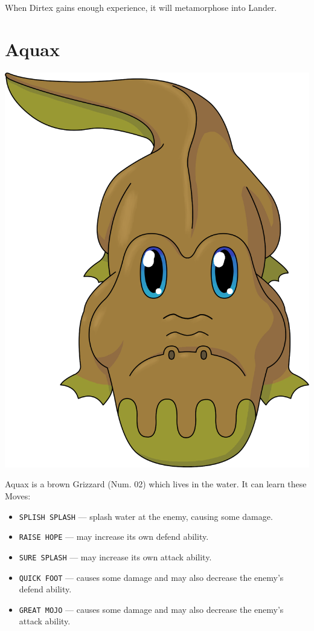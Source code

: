 \documentclass[10pt,twocolumn,openany,article]{memoir}
\begin{document}
When Dirtex gains enough experience, it will metamorphose into Lander.

\fi

\section{Aquax}

\begin{center}
  \includegraphics[width=.75\columnwidth]{../Manual/Aquax.png}
\end{center}


Aquax is  a brown Grizzard  (Num. 02) which lives  in the water.  It can
learn these Moves:

\begin{itemize}
\item  \texttt{SPLISH SPLASH}  --- splash  water at  the enemy,  causing
  some damage. 
\item \texttt{RAISE HOPE} --- may increase its own defend ability.
\item \texttt{SURE SPLASH} --- may increase its own attack ability.
\item \texttt{QUICK FOOT}  --- causes some damage and  may also decrease
  the enemy's defend ability.
\item \texttt{GREAT MOJO}  --- causes some damage and  may also decrease
  the enemy's attack ability.
\end{itemize}
\end{document}
